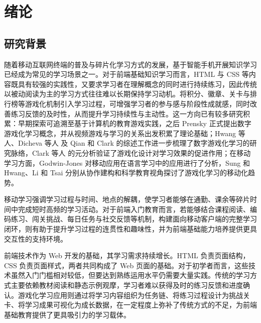 
\chapter{绪论}

\section{研究背景}

随着移动互联网终端的普及与碎片化学习方式的发展，基于智能手机开展知识学习已经成为常见的学习场景之一。对于前端基础知识学习而言，HTML 与 CSS 等内容既具有较强的实践性，又要求学习者在理解概念的同时进行持续练习，因此传统以被动阅读为主的学习方式往往难以长期保持学习动机。将积分、徽章、关卡与排行榜等游戏化机制引入学习过程，可增强学习者的参与感与阶段性成就感，同时改善练习反馈的及时性，从而提升学习持续性与主动性。这一方向已有较多研究积累：早期探索可追溯至基于计算机的教育游戏实践\cite{cullingford1979}，之后 Prensky 正式提出数字游戏化学习概念\cite{prensky2000}，并从视频游戏与学习的关系出发积累了理论基础\cite{squire2003,gee2003}；Hwang 等人\cite{hwang2012}、Dicheva 等人\cite{dicheva2015} 及 Qian 和 Clark\cite{qian2016} 的综述工作进一步梳理了数字游戏化学习的研究脉络，Clark 等人\cite{clark2016} 的元分析验证了游戏化设计对学习效果的促进作用；在移动学习方面，Godwin-Jones\cite{godwinjones2011} 对移动应用在语言学习中的应用进行了分析，Sung 和 Hwang\cite{sung2018}、Li 和 Tsai\cite{li2013} 分别从协作建构和科学教育视角探讨了游戏化学习的移动化趋势\cite{deterding2011,hamari2014,ryan2000}。

移动学习强调学习过程与时间、地点的解耦，使学习者能够在通勤、课余等碎片时间中完成短时高频的学习活动。对于前端入门教育而言，若能够结合课程阅读、编码练习、闯关挑战、每日任务与社交反馈等机制，构建面向移动客户端的完整学习闭环，则有助于提升学习过程的连贯性和趣味性，并为前端基础能力培养提供更具交互性的支持环境\cite{liang2018,jiao2023}。

前端技术作为 Web 开发的基础，其学习需求持续增长。HTML 负责页面结构，CSS 负责页面样式，两者共同构成了 Web 页面的基础。对于初学者而言，这些技术虽然入门门槛相对较低，但要达到熟练运用水平仍需要大量实践。传统的学习方式主要依赖教材阅读和静态示例观摩，学习者难以获得及时的练习反馈和进度确认。游戏化学习应用则通过将学习内容组织为任务链、将练习过程设计为挑战关卡、将学习成果可视化为成长数据，在一定程度上弥补了传统方式的不足，为前端基础教育提供了更具吸引力的学习载体。

